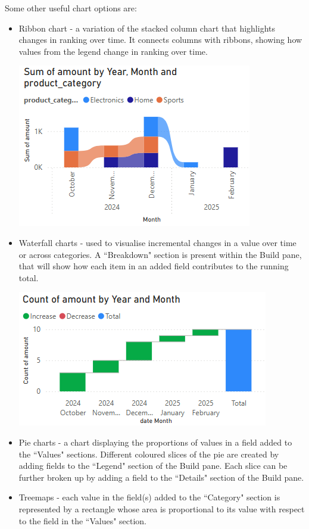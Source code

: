 \documentclass[10pt, openany, twocolumn]{book}
\begin{document}
Some other useful chart options are:
\begin{itemize}
    \item Ribbon chart - a variation of the stacked column chart that highlights changes in ranking over time. It connects columns with ribbons, showing how values from the legend change in ranking over time. 
    \begin{center}
    \includegraphics[width=0.75\columnwidth]{images/ribbon.png}
    \end{center}
    \item Waterfall charts - used to visualise incremental changes in a value over time or across categories. A ``Breakdown" section is present within the Build pane, that will show how each item in an added field contributes to the running total. 
    \begin{center}
    \includegraphics[width=0.75\columnwidth]{images/waterfall.png}
    \end{center}    
    \item Pie charts - a chart displaying the proportions of values in a field added to the ``Values" sections. Different coloured slices of the pie are created by adding fields to the ``Legend" section of the Build pane. Each slice can be further broken up by adding a field to the ``Details" section of the Build pane.
    \item Treemaps - each value in the field(s) added to the ``Category" section is represented by a rectangle whose area is proportional to its value with respect to the field in the ``Values" section.  

\end{itemize}
\end{document}
